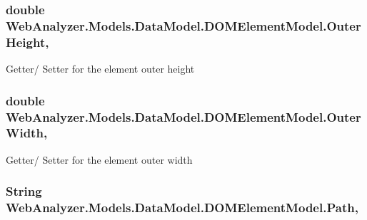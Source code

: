 \subsubsection[{Outer\+Height}]{\setlength{\rightskip}{0pt plus 5cm}double Web\+Analyzer.\+Models.\+Data\+Model.\+D\+O\+M\+Element\+Model.\+Outer\+Height\hspace{0.3cm}{\ttfamily [get]}, {\ttfamily [set]}}\label{class_web_analyzer_1_1_models_1_1_data_model_1_1_d_o_m_element_model_a9c280fbbc109f824b51ca934192da464}


Getter/ Setter for the element outer height 

\hypertarget{class_web_analyzer_1_1_models_1_1_data_model_1_1_d_o_m_element_model_a3bf025c2cfc55086914d5f262b2f3e3e}{}
\subsubsection[{Outer\+Width}]{\setlength{\rightskip}{0pt plus 5cm}double Web\+Analyzer.\+Models.\+Data\+Model.\+D\+O\+M\+Element\+Model.\+Outer\+Width\hspace{0.3cm}{\ttfamily [get]}, {\ttfamily [set]}}\label{class_web_analyzer_1_1_models_1_1_data_model_1_1_d_o_m_element_model_a3bf025c2cfc55086914d5f262b2f3e3e}


Getter/ Setter for the element outer width 

\hypertarget{class_web_analyzer_1_1_models_1_1_data_model_1_1_d_o_m_element_model_a51a4d9000890ebe19b35812780d3bf92}{}
\subsubsection[{Path}]{\setlength{\rightskip}{0pt plus 5cm}String Web\+Analyzer.\+Models.\+Data\+Model.\+D\+O\+M\+Element\+Model.\+Path\hspace{0.3cm}{\ttfamily [get]}, {\ttfamily [set]}}\label{class_web_analyzer_1_1_models_1_1_data_model_1_1_d_o_m_element_model_a51a4d9000890ebe19b35812780d3bf92}


